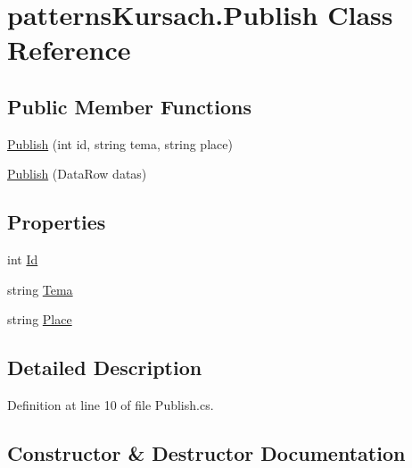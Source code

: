 \hypertarget{classpatterns_kursach_1_1_publish}{}\section{patterns\+Kursach.\+Publish Class Reference}
\label{classpatterns_kursach_1_1_publish}
\subsection*{Public Member Functions}
\begin{DoxyCompactItemize}
\item 
\mbox{\hyperlink{classpatterns_kursach_1_1_publish_a24b11257b2dc624f57ae7a54c6f2b4df}{Publish}} (int id, string tema, string place)
\item 
\mbox{\hyperlink{classpatterns_kursach_1_1_publish_aa4276c74c450ea5d52ad3c5d993957e7}{Publish}} (Data\+Row datas)
\end{DoxyCompactItemize}
\subsection*{Properties}
\begin{DoxyCompactItemize}
\item 
int \mbox{\hyperlink{classpatterns_kursach_1_1_publish_aea975a97fda5fe5ce6819b39f44dea76}{Id}}
\item 
string \mbox{\hyperlink{classpatterns_kursach_1_1_publish_a0e90f8e6a65fb7af38629af11f9df0fc}{Tema}}
\item 
string \mbox{\hyperlink{classpatterns_kursach_1_1_publish_ac20d4f17cd986d842eb5840f121fcec6}{Place}}
\end{DoxyCompactItemize}


\subsection{Detailed Description}


Definition at line 10 of file Publish.\+cs.



\subsection{Constructor \& Destructor Documentation}
\mbox{\label{classpatterns_kursach_1_1_publish_a24b11257b2dc624f57ae7a54c6f2b4df}} 
